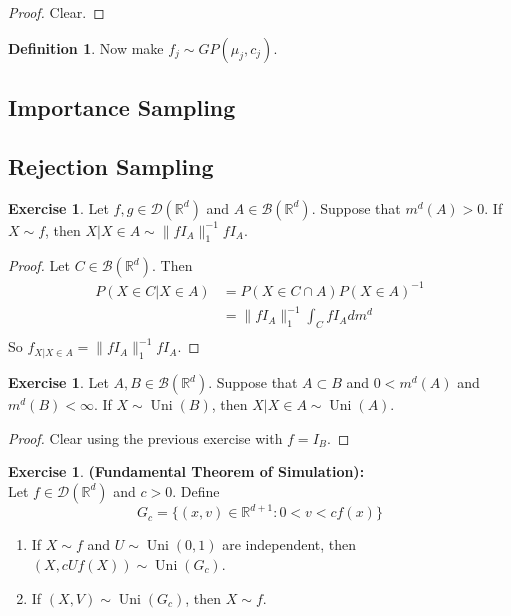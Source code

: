 \documentclass[12pt]{amsart}
\theoremstyle{definition}
\newtheorem{defn}[definition]{Definition}
\theoremstyle{remark}
\theoremstyle{definition}
\newtheorem{ex}[definition]{Exercise}
\newcommand{\R}{\mathbb{R}}
\newcommand{\MB}{\mathcal{B}}
\newcommand{\MD}{\mathcal{D}}
\DeclareMathOperator{\uni}{Uni}
\begin{document}
	\begin{proof}
	Clear.
	\end{proof}
	
	\begin{defn}
	Now make $f_j \sim GP(\mu_j, c_j)$. 	
	\end{defn}
	
	\subsection{Importance Sampling}
	
	\subsection{Rejection Sampling}
	
	\begin{ex}
		Let $f, g \in \MD(\R^d)$ and $A \in \MB(\R^d)$. Suppose that $m^d(A) > 0$. If $X \sim f$, then $X|X \in A \sim \|fI_A\|_1^{-1}fI_A$. 
	\end{ex}

	\begin{proof}
		Let $C \in \MB(\R^d)$. Then
		\begin{align*}
			P(X \in C|X \in A)
			&= P(X \in C \cap A) P(X \in A)^{-1} \\
			&= \|fI_A\|_1^{-1} \int_C fI_A dm^d \\
		\end{align*}
		So $f_{X|X \in A} = \|fI_A\|_1^{-1}fI_A$.
	\end{proof}
	
	\begin{ex}
		Let $A, B \in \MB(\R^d)$. Suppose that $A \subset B$ and $0 < m^d(A)$ and $ m^{d}(B) < \infty$. If $X \sim \uni(B)$, then $X|X \in A \sim \uni(A)$. 
	\end{ex}

	\begin{proof}
		Clear using the previous exercise with $f = I_B$.
	\end{proof}
	
	\begin{ex}\textbf{(Fundamental Theorem of Simulation):} \\
		Let $f \in \MD(\R^d)$ and $c > 0$. Define $$G_c = \{(x,v) \in \R^{d+1}: 0< v < cf(x)\}$$ 
		\begin{enumerate}
			\item If $X \sim f$ and $U \sim \uni(0,1)$  are independent, then $(X, cUf(X)) \sim \uni(G_c)$.
			\item If $(X, V) \sim \uni(G_c)$, then $X \sim f$.
		\end{enumerate}
	\end{ex}
\end{document}
